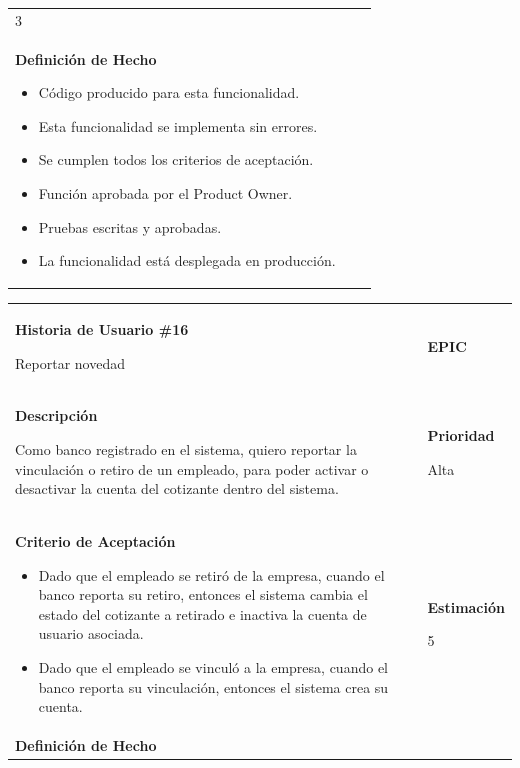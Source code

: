 \documentclass[12pt,a4paper]{article}
\begin{document}
\begin{center}
\begin{tabular}{| p{10cm} c p{2.5cm}|}
3 \\ 

\textbf{Definición de Hecho}

\begin{itemize}
\item Código producido para esta funcionalidad.
\item Esta funcionalidad se implementa sin errores.
\item Se cumplen todos los criterios de aceptación.
\item Función aprobada por el Product Owner.
\item Pruebas escritas y aprobadas.
\item La funcionalidad está desplegada en producción.
\end{itemize} & & \\
\hline  
\end{tabular}
\vspace{5mm}

\begin{tabular}{|>{\columncolor[RGB]{215, 215, 215}} p{10cm} >{\columncolor[RGB]{215, 215, 215}} c >{\columncolor[RGB]{215, 215, 215}} p{2.5cm}|}
\hline 
\textbf{Historia de Usuario \#16}

Reportar novedad & & \textbf{{\Large EPIC}} \\ 
\textbf{Descripción}

Como banco registrado en el sistema, quiero reportar la vinculación o
retiro de un empleado, para poder activar o desactivar la cuenta del
cotizante dentro del sistema. &  & \textbf{Prioridad}

Alta\\

\textbf{Criterio de Aceptación}

\begin{itemize}
\item Dado que el empleado se retiró de la empresa, cuando el banco
reporta su retiro, entonces el sistema cambia el estado del
cotizante a retirado e inactiva la cuenta de usuario asociada.
\item Dado que el empleado se vinculó a la empresa, cuando el banco
reporta su vinculación, entonces el sistema crea su cuenta.
\end{itemize} & & \textbf{Estimación}

5 \\ 

\textbf{Definición de Hecho}


\end{tabular}
\end{center}
\end{document}
